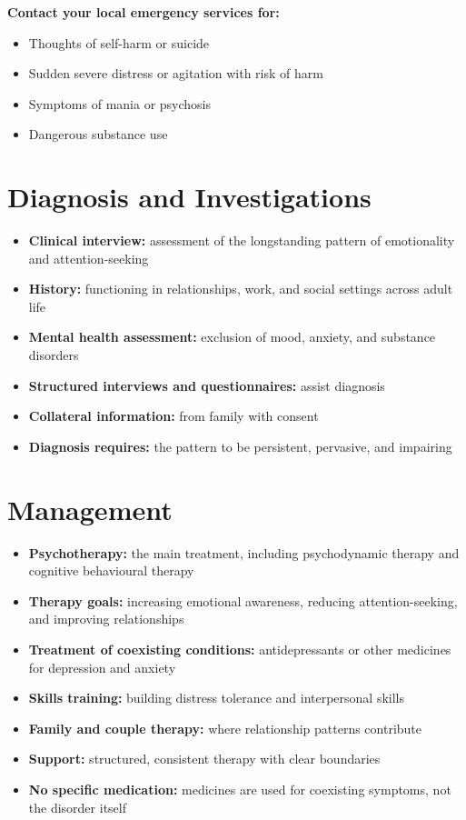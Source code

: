 \textbf{Contact your local emergency services for:}
\begin{itemize}
    \item Thoughts of self-harm or suicide
    \item Sudden severe distress or agitation with risk of harm
    \item Symptoms of mania or psychosis
    \item Dangerous substance use
\end{itemize}

\section*{Diagnosis and Investigations}
\begin{itemize}
    \item \textbf{Clinical interview:} assessment of the longstanding pattern of emotionality and attention-seeking
    \item \textbf{History:} functioning in relationships, work, and social settings across adult life
    \item \textbf{Mental health assessment:} exclusion of mood, anxiety, and substance disorders
    \item \textbf{Structured interviews and questionnaires:} assist diagnosis
    \item \textbf{Collateral information:} from family with consent
    \item \textbf{Diagnosis requires:} the pattern to be persistent, pervasive, and impairing
\end{itemize}

\section*{Management}
\begin{itemize}
    \item \textbf{Psychotherapy:} the main treatment, including psychodynamic therapy and cognitive behavioural therapy
    \item \textbf{Therapy goals:} increasing emotional awareness, reducing attention-seeking, and improving relationships
    \item \textbf{Treatment of coexisting conditions:} antidepressants or other medicines for depression and anxiety
    \item \textbf{Skills training:} building distress tolerance and interpersonal skills
    \item \textbf{Family and couple therapy:} where relationship patterns contribute
    \item \textbf{Support:} structured, consistent therapy with clear boundaries
    \item \textbf{No specific medication:} medicines are used for coexisting symptoms, not the disorder itself
\end{itemize}

